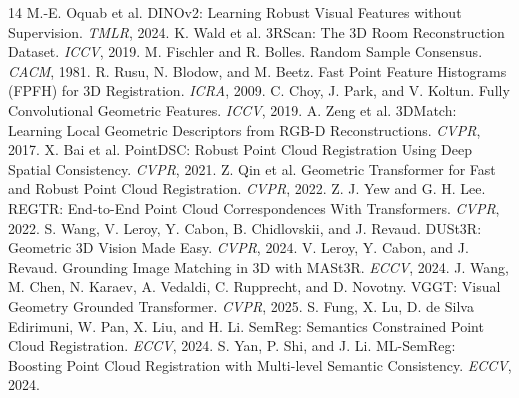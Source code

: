 \documentclass[10pt,twocolumn]{article}
\begin{document}
\begin{thebibliography}{14}
 M.-E. Oquab et al. DINOv2: Learning Robust Visual Features
without Supervision. \emph{TMLR}, 2024.
 K. Wald et al. 3RScan: The 3D Room Reconstruction Dataset.
\emph{ICCV}, 2019.
 M. Fischler and R. Bolles. Random Sample Consensus.
\emph{CACM}, 1981.
 R. Rusu, N. Blodow, and M. Beetz. Fast Point Feature Histograms
(FPFH) for 3D Registration. \emph{ICRA}, 2009.
 C. Choy, J. Park, and V. Koltun. Fully Convolutional Geometric
Features. \emph{ICCV}, 2019.
 A. Zeng et al. 3DMatch: Learning Local Geometric Descriptors
from RGB-D Reconstructions. \emph{CVPR}, 2017.
 X. Bai et al. PointDSC: Robust Point Cloud Registration
Using Deep Spatial Consistency. \emph{CVPR}, 2021.
 Z. Qin et al. Geometric Transformer for Fast and Robust
Point Cloud Registration. \emph{CVPR}, 2022.
 Z. J. Yew and G. H. Lee. REGTR: End-to-End Point Cloud
Correspondences With Transformers. \emph{CVPR}, 2022.
 S. Wang, V. Leroy, Y. Cabon, B. Chidlovskii, and J. Revaud.
DUSt3R: Geometric 3D Vision Made Easy. \emph{CVPR}, 2024.
 V. Leroy, Y. Cabon, and J. Revaud. Grounding Image Matching
in 3D with MASt3R. \emph{ECCV}, 2024.
 J. Wang, M. Chen, N. Karaev, A. Vedaldi, C. Rupprecht, and
D. Novotny. VGGT: Visual Geometry Grounded Transformer. \emph{CVPR}, 2025.
 S. Fung, X. Lu, D. de Silva Edirimuni, W. Pan, X. Liu, and
H. Li. SemReg: Semantics Constrained Point Cloud Registration. \emph{ECCV}, 2024.
 S. Yan, P. Shi, and J. Li. ML-SemReg: Boosting Point Cloud
Registration with Multi-level Semantic Consistency. \emph{ECCV}, 2024.
\end{thebibliography}
\end{document}
